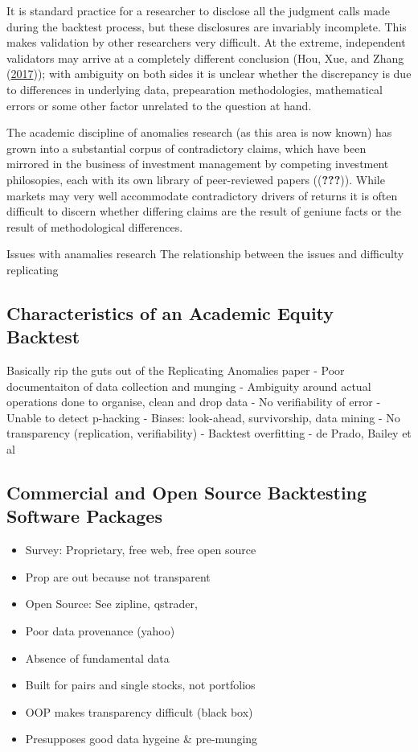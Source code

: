 \documentclass[11pt,preprint, authoryear]{elsarticle}
\numberwithin{equation}{section}
\numberwithin{figure}{section}
\numberwithin{table}{section}
\def\tightlist{} %
\begin{document}
It is standard practice for a researcher to disclose all the judgment
calls made during the backtest process, but these disclosures are
invariably incomplete. This makes validation by other researchers very
difficult. At the extreme, independent validators may arrive at a
completely different conclusion (Hou, Xue, and Zhang
(\protect\hyperlink{ref-Hou2017}{2017})); with ambiguity on both sides
it is unclear whether the discrepancy is due to differences in
underlying data, prepearation methodologies, mathematical errors or some
other factor unrelated to the question at hand.

The academic discipline of anomalies research (as this area is now
known) has grown into a substantial corpus of contradictory claims,
which have been mirrored in the business of investment management by
competing investment philosopies, each with its own library of
peer-reviewed papers (({\textbf{???}})). While markets may very well
accommodate contradictory drivers of returns it is often difficult to
discern whether differing claims are the result of geniune facts or the
result of methodological differences.

Issues with anamalies research The relationship between the issues and
difficulty replicating

\subsection{Characteristics of an Academic Equity
Backtest}\label{characteristics-of-an-academic-equity-backtest}

Basically rip the guts out of the Replicating Anomalies paper - Poor
documentaiton of data collection and munging - Ambiguity around actual
operations done to organise, clean and drop data - No verifiability of
error - Unable to detect p-hacking - Biases: look-ahead, survivorship,
data mining - No transparency (replication, verifiability) - Backtest
overfitting - de Prado, Bailey et al

\subsection{Commercial and Open Source Backtesting Software
Packages}\label{commercial-and-open-source-backtesting-software-packages}

\begin{itemize}
\tightlist
\item
  Survey: Proprietary, free web, free open source
\item
  Prop are out because not transparent
\item
  Open Source: See zipline, qstrader,
\item
  Poor data provenance (yahoo)
\item
  Absence of fundamental data
\item
  Built for pairs and single stocks, not portfolios
\item
  OOP makes transparency difficult (black box)
\item
  Presupposes good data hygeine \& pre-munging
\end{itemize}
\end{document}
